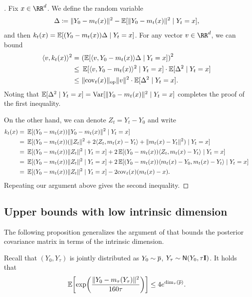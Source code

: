 \begin{proof}[]
Fix $x\in\RR^d$. We define the random variable
\begin{align*}
    \Delta\coloneqq  \lVert Y_0-m_t(x)\rVert^2-\operatorname{\mathbb{E}}[ \lVert Y_0-m_t(x)\rVert^2 \mid Y_t=x ],
\end{align*}
and then $k_t(x)=\operatorname{\mathbb{E}}[ (Y_0-m_t(x))\Delta\mid Y_t=x ]$.
For any vector $v\in\RR^d$, we can bound
\begin{align*}
    \tri{v,k_t(x)}^2
    =&~\prn*{ \En[ \tri{v,Y_0-m_t(x)}\Delta \mid Y_t=x ] }^2 \\
    \leq&~ \En[ \tri{v,Y_0-m_t(x)}^2\mid Y_t=x ] \cdot \En[ \Delta^2 \mid Y_t=x ] \\
    \leq&~ \nrmop{\cov_t(x)} \nrm{v}^2 \cdot \En[ \Delta^2 \mid Y_t=x ].
\end{align*}
Noting that $\operatorname{\mathbb{E}}[ \Delta^2 \mid Y_t=x ]=\mathrm{Var}[ \lVert Y_0-m_t(x)\rVert^2 \mid Y_t=x ]$ completes the proof of the first inequality.

On the other hand, we can denote $Z_t=Y_t-Y_0$ and write
\begin{align*}
    k_t(x)=&~\operatorname{\mathbb{E}}[ (Y_0-m_t(x))\lVert Y_0-m_t(x)\rVert^2 \mid Y_t=x ] \\
    =&~ \operatorname{\mathbb{E}}[ (Y_0-m_t(x))(\lVert Z_t\rVert^2+2\langle Z_t,m_t(x)-Y_t\rangle+\lVert m_t(x)-Y_t\rVert^2) \mid Y_t=x ] \\
    =&~ \operatorname{\mathbb{E}}[ (Y_0-m_t(x))\lVert Z_t\rVert^2 \mid Y_t=x ]
    +2\operatorname{\mathbb{E}}[ (Y_0-m_t(x))\langle Z_t,m_t(x)-Y_t\rangle \mid Y_t=x ] \\
    =&~ \operatorname{\mathbb{E}}[ (Y_0-m_t(x))\lVert Z_t\rVert^2 \mid Y_t=x ]
    +2\operatorname{\mathbb{E}}[ (Y_0-m_t(x))\langle m_t(x)-Y_0,m_t(x)-Y_t\rangle \mid Y_t=x ] \\
    =&~ \operatorname{\mathbb{E}}[ (Y_0-m_t(x))\lVert Z_t\rVert^2 \mid Y_t=x ]-2\mathrm{cov}_t(x)(m_t(x)-x).
\end{align*}
Repeating our argument above gives the second inequality.
\end{proof}



\subsection{Upper bounds with low intrinsic dimension}


The following proposition generalizes the argument of \citet{HuaWeiChe26LowDim} that bounds the posterior covariance matrix in terms of the intrinsic dimension. 

\begin{proposition}\label{prop:logp-adapt}
Recall that $(Y_0,Y_\tau)$ is jointly distributed as $Y_0\sim \overline{p}$, $Y_\tau\sim \normal{Y_0,\tau\Id}$. It holds that
\begin{align*}
    \En\brk*{ \exp\prn*{ \frac{\nrm{Y_0-m_\tau(Y_\tau)}^2}{160\tau} }}\leq 4e^{\dim_\tau(\pbar)}.
\end{align*}
\end{proposition}


